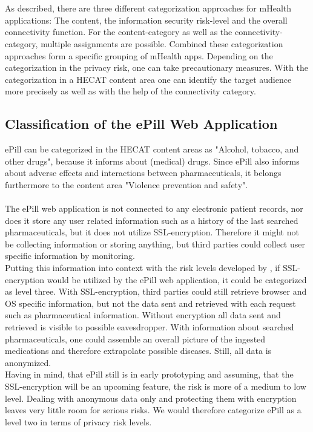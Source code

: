 \\
\\
As described, there are three different categorization approaches for mHealth applications: The content, the information security risk-level and the overall connectivity function. For the content-category as well as the connectivity-category, multiple assignments are possible. Combined these categorization approaches form a specific grouping of mHealth apps. Depending on the categorization in the privacy risk, one can take precautionary measures. With the categorization in a HECAT content area one can identify the target audience more precisely as well as with the help of the connectivity category.

\subsection{Classification of the ePill Web Application}
ePill can be categorized in the HECAT content areas as "Alcohol, tobacco, and other drugs", because it informs about (medical) drugs. Since ePill also informs about adverse effects and interactions between pharmaceuticals, it belongs furthermore to the content area "Violence prevention and safety".
\\
\\
The ePill web application is not connected to any electronic patient records, nor does it store any user related information such as a history of the last searched pharmaceuticals, but it does not utilize SSL-encryption. Therefore it might not be collecting information or storing anything, but third parties could collect user specific information by monitoring.
\\
Putting this information into context with the risk levels developed by \cite{Njie.2013}, if SSL-encryption would be utilized by the ePill web application, it could be categorized as level three. With SSL-encryption, third parties could still retrieve browser and OS specific information, but not the data sent and retrieved with each request such as pharmaceutical information. Without encryption all data sent and retrieved is visible to possible eavesdropper. With information about searched pharmaceuticals, one could assemble an overall picture of the ingested medications and therefore extrapolate possible diseases. Still, all data is anonymized.
\\
Having in mind, that ePill still is in early prototyping and assuming, that the SSL-encryption will be an upcoming feature, the risk is more of a medium to low level. Dealing with anonymous data only and protecting them with encryption leaves very little room for serious risks. We would therefore categorize ePill as a level two in terms of privacy risk levels.
